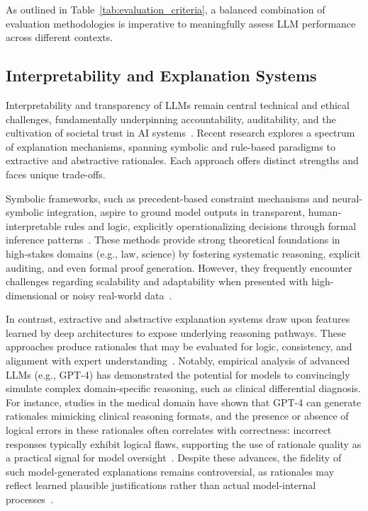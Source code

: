 \documentclass[sigconf]{acmart}
\begin{document}
As outlined in Table~\ref{tab:evaluation_criteria}, a balanced combination of evaluation methodologies is imperative to meaningfully assess LLM performance across different contexts.

\subsection{Interpretability and Explanation Systems}

Interpretability and transparency of LLMs remain central technical and ethical challenges, fundamentally underpinning accountability, auditability, and the cultivation of societal trust in AI systems~\cite{ref1, ref2, ref3, ref10, ref14, ref18, ref19, ref35, ref36, ref41, ref43, ref45, ref46, ref49, ref52, ref73, ref83, ref84, ref85}. Recent research explores a spectrum of explanation mechanisms, spanning symbolic and rule-based paradigms to extractive and abstractive rationales. Each approach offers distinct strengths and faces unique trade-offs.

Symbolic frameworks, such as precedent-based constraint mechanisms and neural-symbolic integration, aspire to ground model outputs in transparent, human-interpretable rules and logic, explicitly operationalizing decisions through formal inference patterns~\cite{ref14, ref18, ref19, ref45, ref73}. These methods provide strong theoretical foundations in high-stakes domains (e.g., law, science) by fostering systematic reasoning, explicit auditing, and even formal proof generation. However, they frequently encounter challenges regarding scalability and adaptability when presented with high-dimensional or noisy real-world data~\cite{ref14, ref18, ref41, ref46, ref83}.

In contrast, extractive and abstractive explanation systems draw upon features learned by deep architectures to expose underlying reasoning pathways. These approaches produce rationales that may be evaluated for logic, consistency, and alignment with expert understanding~\cite{ref1, ref3, ref10, ref35, ref41, ref45, ref49, ref85}. Notably, empirical analysis of advanced LLMs (e.g., GPT-4) has demonstrated the potential for models to convincingly simulate complex domain-specific reasoning, such as clinical differential diagnosis. For instance, studies in the medical domain have shown that GPT-4 can generate rationales mimicking clinical reasoning formats, and the presence or absence of logical errors in these rationales often correlates with correctness: incorrect responses typically exhibit logical flaws, supporting the use of rationale quality as a practical signal for model oversight~\cite{ref1, ref10}. Despite these advances, the fidelity of such model-generated explanations remains controversial, as rationales may reflect learned plausible justifications rather than actual model-internal processes~\cite{ref3, ref43, ref84}.
\end{document}
